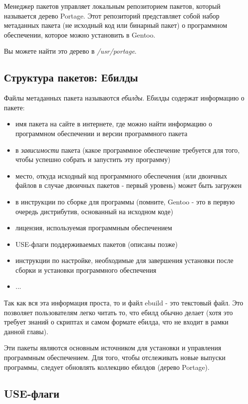 \documentclass[10pt]{book}
\begin{document}
Менеджер пакетов управляет локальным репозиторием пакетов, который называется дерево Portage. Этот репозиторий представляет собой набор метаданных пакета (не исходный код или бинарный пакет) о программном обеспечении, которое можно установить в Gentoo.

Вы можете найти это дерево в \textit{/usr/portage}.

\subsection{Структура пакетов: Ебилды}

 Файлы метаданных пакета называются \textit{ебилды}. Ебилды содержат информацию о пакете:

\begin{itemize}
\item имя пакета на сайте в интернете, где можно найти информацию о программном обеспечении и версии программного пакета
\item в \textit{зависимости} пакета (какое программное обеспечение требуется для того, чтобы успешно собрать и запустить эту программу)
\item место, откуда исходный код программного обеспечения (или двоичных файлов в случае двоичных пакетов - первый уровень) может быть загружен
\item в инструкции по сборке для программы (помните, Gentoo - это в первую очередь дистрибутив, основанный на исходном коде)
\item лицензия, используемая программным обеспечением
\item USE-флаги поддерживаемых пакетов (описаны позже)
\item инструкции по настройке, необходимые для завершения установки после сборки и установки программного обеспечения
\item ...
\end{itemize}

Так как вся эта информация проста, то и файл ebuild - это текстовый файл. Это позволяет пользователям легко читать то, что ебилд обычно делает (хотя это требует знаний о скриптах и самом формате ебилда, что не входит в рамки данной главы).

Эти пакеты являются основным источником для установки и управления программным обеспечением. Для того, чтобы отслеживать новые выпуски программы, следует обновлять коллекцию ебилдов (дерево Portage).

\subsection{USE-флаги}
\end{document}
